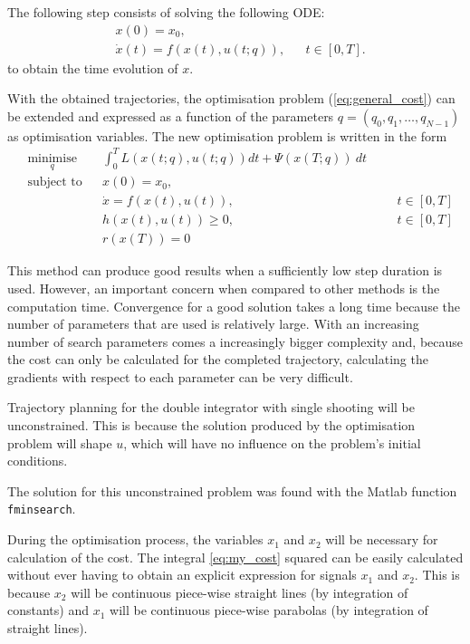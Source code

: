 \par The following step consists of solving the following \ac{ODE}:
\begin{equation}
    \label{eq:ode_zoh}
    \begin{aligned}
        & x(0) = x_0, \\
        & \dot{x}(t) = f(x(t),u(t;q)), && t\in[0,T].
    \end{aligned}
\end{equation}
to obtain the time evolution of $x$.

\par With the obtained trajectories, the optimisation problem (\ref{eq:general_cost}) can be extended and expressed as a function of the parameters $q=(q_0,q_1,\dots,q_{N-1})$ as optimisation variables. The new optimisation problem is written in the form  
\begin{equation}
    \begin{aligned}
    & \underset{q}{\text{minimise}} && \int_0^T L(x(t;q),u(t;q))dt + \Psi (x(T;q)) \ dt \\
    & \text{subject to}  && x(0) = x_0, \\
        & && \dot{x} = f(x(t), u(t)), &&& t \in [0,T]  \\
        & && h(x(t),u(t)) \geq 0, &&&  t \in [0,T]  \\
        & && r(x(T)) = 0
    \end{aligned}
    \label{eq:cost_zoh}
\end{equation}

\par This method can produce good results when a sufficiently low step duration is used. However, an important concern when compared to other methods is the computation time. Convergence for a good solution takes a long time because the number of parameters that are used is relatively large. With an increasing number of search parameters comes a increasingly bigger complexity and, because the cost can only be calculated for the completed trajectory, calculating the gradients with respect to each parameter can be very difficult.

\par Trajectory planning for the double integrator with single shooting will be unconstrained. This is because the solution produced by the optimisation problem will shape $u$, which will have no influence on the problem's initial conditions. 
\par The solution for this unconstrained problem was found with the Matlab function \texttt{fminsearch}.
\par During the optimisation process, the variables $x_1$ and $x_2$ will be necessary for calculation of the cost. The integral \ref{eq:my_cost} squared  can be easily calculated without ever having to obtain an explicit expression for signals $x_1$ and $x_2$. This is because $x_2$ will be continuous piece-wise straight lines (by integration of constants) and $x_1$ will be continuous piece-wise parabolas (by integration of straight lines).

